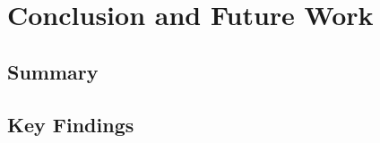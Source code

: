 \chapter{Conclusion and Future Work}
\label{ch:conclusion}

\section{Summary}
\label{sec:summary}


%
%

\section{Key Findings}
\label{sec:key-findings}

